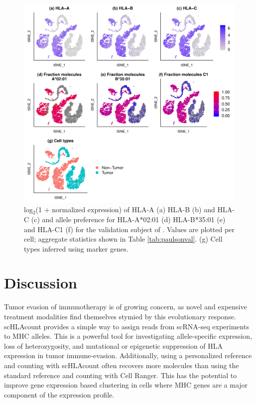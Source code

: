 \documentclass{article}[12pt]
\begin{document}
\begin{figure}
    
    \includegraphics[width=\textwidth]{figures/figure3-newlayout.pdf}
    \caption{log$_2$(1 + normalized expression) of HLA-A (a) HLA-B (b) and HLA-C (c) and allele preference for HLA-A*02:01 (d) HLA-B*35:01 (e) and HLA-C1 (f) for the validation subject of \parencite{Paulson2018}. Values are plotted per cell; aggregate statistics shown in Table \ref{tab:paulsonval}. (g) Cell types inferred using marker genes.}
    \label{fig:paulsonval}
\end{figure}




\section*{Discussion}

Tumor evasion of immunotherapy is of growing concern, as novel and expensive treatment modalities find themselves stymied by this evolutionary response. scHLAcount provides a simple way to assign reads from scRNA-seq experiments to MHC alleles. This is a powerful tool for investigating allele-specific expression, loss of heterozygosity, and mutational or epigenetic suppression of HLA expression in tumor immune-evasion. Additionally, using a personalized reference and counting with scHLAcount often recovers more molecules than using the standard reference and counting with Cell Ranger. This has the potential to improve gene expression based clustering in cells where MHC genes are a major component of the expression profile.
\end{document}
